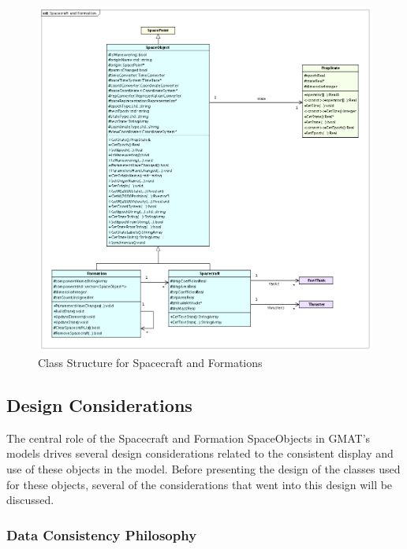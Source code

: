 \begin{figure}
\begin{center}
\includegraphics[400,500]{Images/SpacecraftandFormation.png}
\caption{\label{figure:SpacecraftandFormation}Class Structure for Spacecraft and Formations}
\end{center}
\end{figure}

\subsection{Design Considerations}

The central role of the Spacecraft and Formation SpaceObjects in GMAT's models drives several
design considerations related to the consistent display and use of these objects in the model.
Before presenting the design of the classes used for these objects, several of the considerations
that went into this design will be discussed.

\subsubsection{Data Consistency Philosophy}

